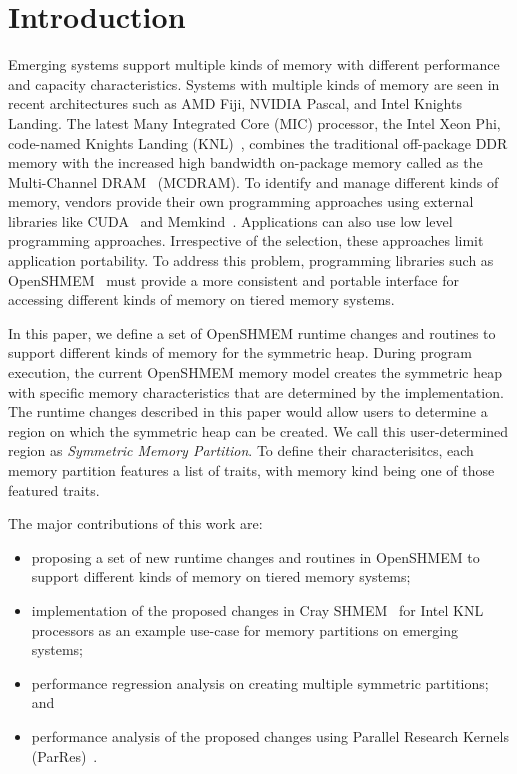 \section{Introduction}
\label{src:intro}

Emerging systems support multiple kinds of memory with different
performance and capacity characteristics. %
Systems with
multiple kinds of memory are seen in recent architectures such as
AMD Fiji, NVIDIA Pascal, and Intel Knights Landing. The latest
Many Integrated Core (MIC) processor, the Intel Xeon Phi,
code-named Knights Landing (KNL)~\cite{KNL}, combines the traditional
off-package DDR memory with the increased high bandwidth on-package
memory called as the Multi-Channel DRAM~\cite{MCDRAM} (MCDRAM). %
To identify and manage different kinds of memory,
vendors provide their own programming approaches
using external libraries like CUDA~\cite{cuda} and
Memkind~\cite{memkind}.
Applications can also use low level programming approaches.
Irrespective of the selection, these approaches limit application
portability. To address this problem, programming libraries such as
OpenSHMEM~\cite{osm} must provide a more consistent and portable
interface for accessing different kinds of memory on tiered memory systems.

In this paper, we define a set of OpenSHMEM runtime changes and routines
to support different kinds of memory for the symmetric heap. During
program execution, the current
OpenSHMEM memory model creates the symmetric heap with specific
memory characteristics that are determined by the implementation.
The runtime changes described in this paper would allow users to
determine a region on which the symmetric heap can be created. We call this
user-determined region as \emph{Symmetric Memory Partition}. To define
their characterisitcs, each memory partition features a list of traits, with 
memory kind being one of those featured traits.

The major contributions of this work are:
\begin{itemize}
    \item proposing a set of new runtime changes and routines in
    OpenSHMEM to support different kinds of memory on tiered memory
    systems;
    \item implementation of the proposed changes in
    Cray SHMEM~\cite{csma} for Intel KNL processors as an example
    use-case for memory partitions on emerging systems;
    \item performance regression analysis on creating multiple
    symmetric partitions; and
    \item performance analysis of the proposed changes using
    Parallel Research Kernels (ParRes)~\cite{parres}.
\end{itemize}

